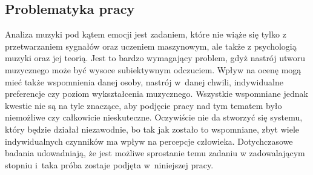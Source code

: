 \subsection{Problematyka pracy}
Analiza muzyki pod kątem emocji jest zadaniem, które nie wiąże się tylko z przetwarzaniem sygnałów oraz uczeniem maszynowym, ale także z psychologią muzyki oraz jej teorią. Jest to bardzo wymagający problem, gdyż nastrój utworu muzycznego może być wysoce subiektywnym odczuciem. Wpływ na ocenę mogą mieć także wspomnienia danej osoby, nastrój w~danej chwili, indywidualne preferencje czy poziom wykształcenia muzycznego. Wszystkie wspomniane jednak kwestie nie są na tyle znaczące, aby podjęcie pracy nad tym tematem było niemożliwe czy całkowicie nieskuteczne. Oczywiście nie da stworzyć się systemu, który będzie działał niezawodnie, bo tak jak zostało to wspomniane, zbyt wiele indywidualnych czynników ma wpływ na percepcje człowieka. Dotychczasowe badania udowadniają, że jest możliwe sprostanie temu zadaniu w zadowalającym stopniu\cite{stateOfArt} i~taka próba zostaje podjęta w~niniejszej pracy.